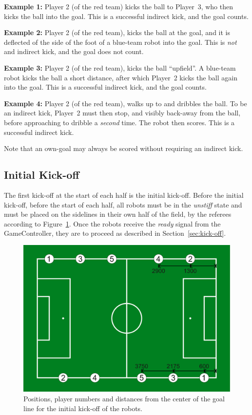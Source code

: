 \textbf{Example 1:} Player 2 (of the red team) kicks the ball to Player~3, who then kicks the ball into the goal. This is a successful indirect kick, and the goal counts.

\textbf{Example 2:} Player 2 (of the red team), kicks the ball at the goal, and it is deflected of the side of the foot of a blue-team robot into the goal. This is \textit{not} and indirect kick, and the goal does not count.

\textbf{Example 3:} Player 2 (of the red team), kicks the ball ``upfield''. A blue-team robot kicks the ball a short distance, after which Player~2 kicks the ball again into the goal. This is a successful indirect kick, and the goal counts.

\textbf{Example 4:} Player 2 (of the red team), walks up to and dribbles the ball. To be an indirect kick, Player~2 must then stop, and visibly back-away from the ball, before approaching to dribble a \textit{second} time. The robot then scores. This is a successful indirect kick.

Note that an own-goal may always be scored without requiring an indirect kick.

\subsection{Initial Kick-off}
\label{sec:initial-kick-off}

The first kick-off at the start of each half is the initial kick-off.
Before the initial kick-off, \ie before the start of each half, all robots must be in the \textit{unstiff} state and must be placed on the sidelines in their own half of the field, by the referees according to Figure~\ref{fig:initial_positions}.
Once the robots receive the \emph{ready} signal from the GameController, they are to proceed as described in Section~\ref{sec:kick-off}.

\begin{figure}[t!]
	\begin{center}
		\leavevmode
		\includegraphics[width=1\columnwidth]{figs/initial_positions.pdf}
		\caption{Positions, player numbers and distances from the center of the goal line for the initial kick-off of the robots.}
		\label{fig:initial_positions}
	\end{center}
\end{figure}

